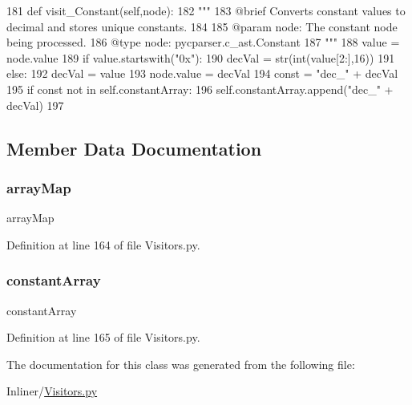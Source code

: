 \begin{DoxyCode}
181     \textcolor{keyword}{def }visit\_Constant(self,node):
182         \textcolor{stringliteral}{"""
}
183 \textcolor{stringliteral}{        @brief Converts constant values to decimal and stores unique constants.
}
184 \textcolor{stringliteral}{
}
185 \textcolor{stringliteral}{        @param node: The constant node being processed.
}
186 \textcolor{stringliteral}{        @type node: pycparser.c\_ast.Constant
}
187 \textcolor{stringliteral}{        """}
188         value = node.value
189         \textcolor{keywordflow}{if} value.startswith(\textcolor{stringliteral}{"0x"}):
190             decVal = str(int(value[2:],16))
191         \textcolor{keywordflow}{else}:
192             decVal = value
193         node.value = decVal
194         const = \textcolor{stringliteral}{"dec\_"} + decVal
195         \textcolor{keywordflow}{if} const \textcolor{keywordflow}{not} \textcolor{keywordflow}{in} self.constantArray:
196             self.constantArray.append(\textcolor{stringliteral}{"dec\_"} + decVal)
197 
\end{DoxyCode}


\subsection{Member Data Documentation}
\mbox{\label{classVisitors_1_1ArrayValueReplacer_a3c14dac355802b0266a75f0ee417c14b}} 
\subsubsection{\texorpdfstring{array\+Map}{arrayMap}}
{\footnotesize\ttfamily array\+Map}



Definition at line 164 of file Visitors.\+py.

\mbox{\label{classVisitors_1_1ArrayValueReplacer_af8146ce56c53debb8b28c2c19e357077}} 
\subsubsection{\texorpdfstring{constant\+Array}{constantArray}}
{\footnotesize\ttfamily constant\+Array}



Definition at line 165 of file Visitors.\+py.



The documentation for this class was generated from the following file\+:\begin{DoxyCompactItemize}
\item 
Inliner/\hyperlink{Visitors_8py}{Visitors.\+py}\end{DoxyCompactItemize}
